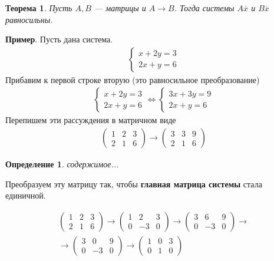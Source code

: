 \documentclass[]{article}
\newtheorem{definition}{Определение}
\newtheorem{theorem}{Теорема}
\begin{document}
\begin{theorem}
	Пусть $A,B$ --- матрицы и $A\rightarrow B$. Тогда системы $A\overline{x}$ и $B\overline{x}$ равносильны.
\end{theorem}

\textbf{Пример}. Пусть дана система. 
\begin{gather*}
	\begin{cases}
		x+2y=3
		\\
		2x+y=6
	\end{cases}
\end{gather*}
Прибавим к первой строке вторую (это равносильное преобразование)
\begin{gather*}
	\begin{cases}
		x+2y=3
		\\
		2x+y=6
	\end{cases}
	\Leftrightarrow 
	\begin{cases}
		3x+3y=9
		\\
		2x+y=6
	\end{cases}
\end{gather*}
Перепишем эти рассуждения в матричном виде
\begin{gather*}
	\left(
	\begin{array}{ll|l}
		1 & 2 & 3
		\\
		2 & 1 & 6
	\end{array}
	\right)
	\rightarrow
	\left(
	\begin{array}{ll|l}
		3 & 3 & 9
		\\
		2 & 1 & 6
	\end{array}
	\right)
\end{gather*}

\begin{definition}
	содержимое...
\end{definition}

Преобразуем эту матрицу так, чтобы \textbf{главная матрица системы} стала единичной.

\begin{gather*}
	\left(
	\begin{array}{ll|l}
		1 & 2 & 3
		\\
		2 & 1 & 6
	\end{array}
	\right)
	\rightarrow
	\left(
\begin{array}{ll|l}
	1 & 2 & 3
	\\
	0 & -3 & 0
\end{array}
\right)
\rightarrow
	\left(
\begin{array}{ll|l}
	3 & 6 & 9
	\\
	0 & -3 & 0
\end{array}
\right)
\rightarrow
\\
\rightarrow
\left(
\begin{array}{ll|l}
	3 & 0 & 9
	\\
	0 & -3 & 0
\end{array}
\right)
\rightarrow
\left(
\begin{array}{ll|l}
	1 & 0 & 3
	\\
	0 & 1 & 0
\end{array}
\right)
\end{gather*}
\end{document}
